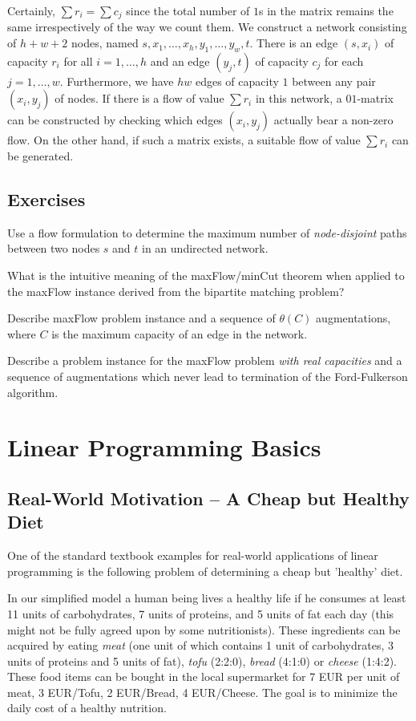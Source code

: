 \documentclass{article}
\newcommand{\Problem}[1]{\par\vspace{3mm}\noindent{\bf Problem{\hspace{1mm}}#1}\hspace{1mm}}
\begin{document}
Certainly, $\sum r_i=\sum c_j$ since the total number of $1$s in the matrix remains the same irrespectively of the way we count them. We construct a network consisting of $h+w+2$ nodes, named $s,x_1, \dots, x_h, y_1,\dots,y_w,t$. There is an edge $(s,x_i)$ of capacity $r_i$ for all $i=1,\dots,h$ and an edge $(y_j,t)$ of capacity $c_j$ for each $j=1,\dots, w$. Furthermore, we have $hw$ edges of capacity $1$ between any pair $(x_i, y_j)$ of nodes. If there is a flow of value $\sum r_i$ in this network, a $01$-matrix can be constructed by checking which edges $(x_i, y_j)$ actually bear a non-zero flow. On the other hand, if such a matrix exists, a suitable flow of value $\sum r_i$ can be generated.
\subsection{Exercises}
\Problem{1}
Use a flow formulation to determine the maximum number of \emph{node-disjoint} paths between two nodes $s$ and $t$ in an undirected network.

\Problem{2}
What is the intuitive meaning of the maxFlow/minCut theorem when applied to the maxFlow instance derived from the bipartite matching problem?

\Problem{3}
Describe maxFlow problem instance and a sequence of $\theta(C)$ augmentations, where $C$
is the maximum capacity of an edge in the network.

\Problem{4}
Describe a problem instance for the maxFlow problem \emph{with real capacities} and a sequence of augmentations which never lead to termination of the Ford-Fulkerson algorithm.

\newpage


\section{Linear Programming Basics}
\subsection{Real-World Motivation -- A Cheap but Healthy Diet}
One of the standard textbook examples for real-world applications of linear programming
is the following problem of determining a cheap but 'healthy' diet.

In our simplified model a human being lives a healthy life if he consumes  at least 11 units of carbohydrates, 7 units of proteins,
 and 5 units of fat each day (this might not be fully agreed upon by some nutritionists).
These ingredients can be acquired by eating \emph{meat} (one unit of which contains 1 unit of carbohydrates, 3 units of proteins and
5 units of fat), \emph{tofu} (2:2:0), \emph{bread} (4:1:0) or \emph{cheese} (1:4:2). These food items can be bought in the local
supermarket for 7 EUR per unit of meat, 3 EUR/Tofu, 2 EUR/Bread, 4 EUR/Cheese. The goal is to minimize the daily cost of
a healthy nutrition. 
\end{document}
